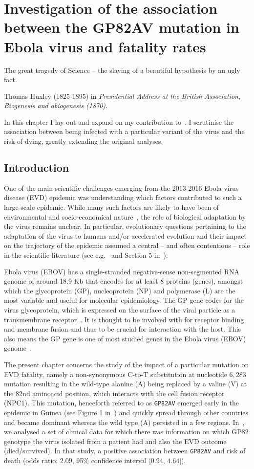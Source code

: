 \chapter{Investigation of the association between the GP82AV mutation in Ebola virus and fatality rates}
\epigraph{The great tragedy of Science -- the slaying of a beautiful hypothesis by an ugly fact.}{Thomas Huxley (1825-1895) in \textit{Presidential Address at the British Association, Biogenesis and abiogenesis (1870)}.}


In this chapter I lay out and expand on my contribution to~\cite{Diehl2016}.
I scrutinise the association between being infected with a particular variant of the virus and the risk of dying, greatly extending the original analyses.

\section{Introduction}

One of the main scientific challenges emerging from the 2013-2016 Ebola virus disease (EVD) epidemic was understanding which factors contributed to such a large-scale epidemic.
While many such factors are likely to have been of environmental and socio-economical nature~\citep{Dudas2017}, the role of biological adaptation by the virus remains unclear.
In particular, evolutionary questions pertaining to the adaptation of the virus to humans and/or accelerated evolution and their impact on the trajectory of the epidemic assumed a central -- and often contentious -- role in the scientific literature (see e.g.~\cite{Holmes2016} and Section 5 in~\cite{Bausch2017}).

Ebola virus (EBOV) has a single-stranded negative-sense non-segmented RNA genome of around 18.9 Kb that encodes for at least 8 proteins (genes), amongst which the glycoprotein (GP), nucleoprotein (NP) and polymerase (L) are the most variable and useful for molecular epidemiology.
The GP gene codes for the virus glycoprotein, which is expressed on the surface of the viral particle as a transmembrane receptor~\citep{Takada1997}.
It is thought to be involved with  for receptor binding and membrane fusion and thus to be crucial for interaction with the host.
This also means the GP gene is one of most studied genes in the Ebola virus (EBOV) genome~\citep{Li2016}.

The present chapter concerns the study of the impact of a particular mutation on EVD fatality, namely a non-synonymous C-to-T substitution at nucleotide $6,283$ mutation resulting in the wild-type alanine (A) being replaced by a valine (V) at the 82nd aminoacid position, which interacts with the cell fusion receptor (NPC1).
This mutation, henceforth referred to as \verb|GP82AV| emerged early in the epidemic in Guinea (see Figure 1 in~\cite{Diehl2016}) and quickly spread through other countries and became dominant whereas the wild type (A) persisted in a few regions.
In~\cite{Diehl2016}, we analysed a set of clinical data for which there was information on which GP82 genotype the virus isolated from a patient had and also the EVD outcome (died/survived).
In that study, a positive association between  \verb|GP82AV| and risk of death (odds ratio: $2.09$, 95\% confidence interval [$0.94$, $4.64$]).

